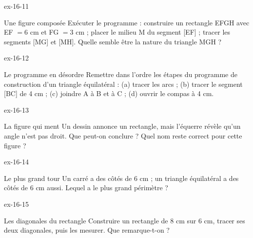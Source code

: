 \begin{blocLivre}{ex-16-11}\begin{exercice}[3]{Une figure composée}
Exécuter le programme : construire un rectangle EFGH avec EF $=6$ cm et FG $=3$ cm ; placer le milieu M du segment [EF] ; tracer les segments [MG] et [MH]. Quelle semble être la nature du triangle MGH ?
\label{fig-ex-16-11}
\end{exercice}\end{blocLivre}
\begin{blocLivre}{ex-16-12}\begin{exercice}[3]{Le programme en désordre}
Remettre dans l’ordre les étapes du programme de construction d’un triangle équilatéral : (a) tracer les arcs ; (b) tracer le segment [BC] de 4 cm ; (c) joindre A à B et à C ; (d) ouvrir le compas à 4 cm.
\label{fig-ex-16-12}
\end{exercice}\end{blocLivre}
\begin{blocLivre}{ex-16-13}\begin{exercice}[3]{La figure qui ment}
Un dessin annonce un rectangle, mais l’équerre révèle qu’un angle n’est pas droit. Que peut-on conclure ? Quel nom reste correct pour cette figure ?
\label{fig-ex-16-13}
\end{exercice}\end{blocLivre}
\begin{blocLivre}{ex-16-14}\begin{exercice}[3]{Le plus grand tour}
Un carré a des côtés de 6 cm ; un triangle équilatéral a des côtés de 6 cm aussi. Lequel a le plus grand périmètre ?
\label{fig-ex-16-14}
\end{exercice}\end{blocLivre}
\begin{blocLivre}{ex-16-15}\begin{exercice}[3]{Les diagonales du rectangle}
Construire un rectangle de 8 cm sur 6 cm, tracer ses deux diagonales, puis les mesurer. Que remarque-t-on ?
\label{fig-ex-16-15}
\end{exercice}\end{blocLivre}

\clearpage
